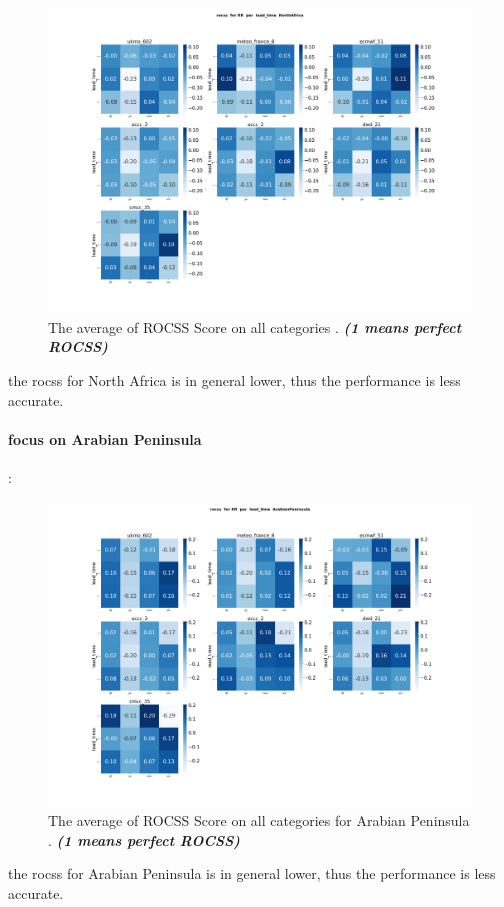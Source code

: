 \begin{figure}[H]
    \centering
    \includegraphics[scale=0.25]{plots/prob/rocss/rocss_RR_lead_time_NorthAfrica.png}
    \caption{The average of  ROCSS Score on all categories    . \textbf{\textit{(1 means perfect ROCSS)}}}
\end{figure}


the rocss for North Africa is in general lower, thus the performance is less accurate.

\paragraph{focus on Arabian Peninsula}:
\begin{figure}[H]
    \centering
    \includegraphics[scale=0.25]{plots/prob/rocss/rocss_RR_lead_time_ArabianPeninsula.png}
    \caption{The average of  ROCSS Score on all categories for Arabian Peninsula . \textbf{\textit{(1 means perfect ROCSS)}}}
\end{figure}


the rocss for Arabian Peninsula is in general lower, thus the performance is less accurate.


